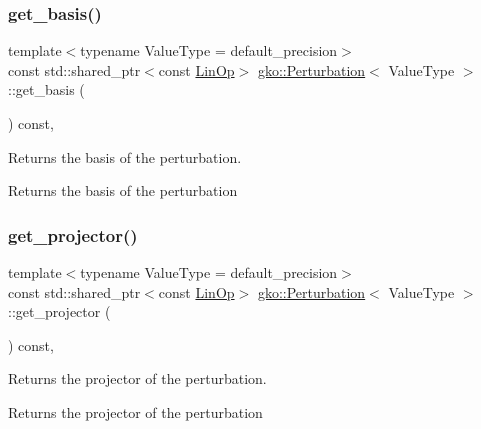 \subsubsection{\texorpdfstring{get\+\_\+basis()}{get\_basis()}}
{\footnotesize\ttfamily template$<$typename Value\+Type  = default\+\_\+precision$>$ \\
const std\+::shared\+\_\+ptr$<$const \hyperlink{classgko_1_1LinOp}{Lin\+Op}$>$ \hyperlink{classgko_1_1Perturbation}{gko\+::\+Perturbation}$<$ Value\+Type $>$\+::get\+\_\+basis (\begin{DoxyParamCaption}{ }\end{DoxyParamCaption}) const\hspace{0.3cm}{\ttfamily [inline]}, {\ttfamily [noexcept]}}



Returns the basis of the perturbation. 

\begin{DoxyReturn}{Returns}
the basis of the perturbation 
\end{DoxyReturn}
\mbox{\label{classgko_1_1Perturbation_a000aeeb35938fef6923673de3b932234}} 
\subsubsection{\texorpdfstring{get\+\_\+projector()}{get\_projector()}}
{\footnotesize\ttfamily template$<$typename Value\+Type  = default\+\_\+precision$>$ \\
const std\+::shared\+\_\+ptr$<$const \hyperlink{classgko_1_1LinOp}{Lin\+Op}$>$ \hyperlink{classgko_1_1Perturbation}{gko\+::\+Perturbation}$<$ Value\+Type $>$\+::get\+\_\+projector (\begin{DoxyParamCaption}{ }\end{DoxyParamCaption}) const\hspace{0.3cm}{\ttfamily [inline]}, {\ttfamily [noexcept]}}



Returns the projector of the perturbation. 

\begin{DoxyReturn}{Returns}
the projector of the perturbation 
\end{DoxyReturn}
\mbox{\label{classgko_1_1Perturbation_af3a1d57c22b34f276a9222eb248825ae}} 

